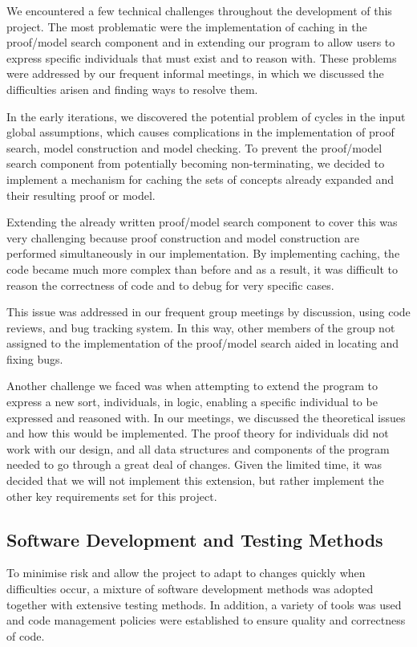 We encountered a few technical challenges throughout the development of this project. The most problematic were the implementation of caching in the proof/model search component and in extending our program to allow users to express specific individuals that must exist and to reason with. These problems were addressed by our frequent informal meetings, in which we discussed the difficulties arisen and finding ways to resolve them.

In the early iterations, we discovered the potential problem of cycles in the input global assumptions, which causes complications in the implementation of proof search, model construction and model checking. To prevent the proof/model search component from potentially becoming non-terminating, we decided to implement a mechanism for caching the sets of concepts already expanded and their resulting proof or model.

Extending the already written proof/model search component to cover this was very challenging because proof construction and model construction are performed simultaneously in our implementation. By implementing caching, the code became much more complex than before and as a result, it was difficult to reason the correctness of code and to debug for very specific cases.

This issue was addressed in our frequent group meetings by discussion, using code reviews, and bug tracking system. In this way, other members of the group not assigned to the implementation of the proof/model search aided in locating and fixing bugs.

Another challenge we faced was when attempting to extend the program to express a new sort, individuals, in logic, enabling a specific individual to be expressed and reasoned with. In our meetings, we discussed the theoretical issues and how this would be implemented. The proof theory for individuals did not work with our design, and all data structures and components of the program needed to go through a great deal of changes. Given the limited time, it was decided that we will not implement this extension, but rather implement the other key requirements set for this project.

\subsection{Software Development and Testing Methods}

To minimise risk and allow the project to adapt to changes quickly when difficulties occur, a mixture of software development methods was adopted together with extensive testing methods. In addition, a variety of tools was used and code management policies were established to ensure quality and correctness of code.


